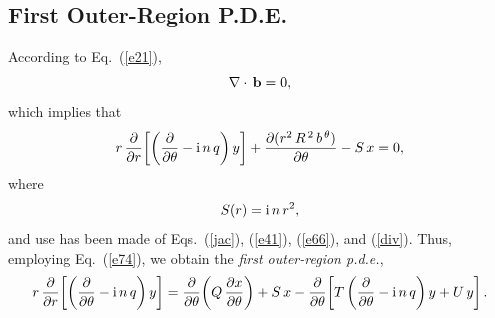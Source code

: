 \documentclass[12pt,prb,aps]{revtex4-1}
\begin{document}
\subsection{First Outer-Region P.D.E.}
According to Eq.~(\ref{e21}), 
\begin{equation}\label{divb}
\nabla \cdot\,{\bf b} =0,
\end{equation}
which implies that
\begin{equation}
r\,\frac{\partial}{\partial r}\!\left[\left(\frac{\partial}{\partial\theta}-{\rm i}\,n\,q\right)y\right]+\frac{\partial (r^2\,R^{\,2}\,b^{\,\theta})}{\partial \theta} - S\,x=0,
\end{equation}
where
\begin{equation}\label{s}
S(r) = {\rm i}\,n\,r^2,
\end{equation}
and use has been made of Eqs.~(\ref{jac}),  (\ref{e41}),  (\ref{e66}), and (\ref{div}).
Thus, employing Eq.~(\ref{e74}), we obtain the {\em first outer-region p.d.e.}, \cite{connor}
\begin{equation}\label{efirst}
r\,\frac{\partial}{\partial r}\!\left[\left(\frac{\partial}{\partial\theta}-{\rm i}\,n\,q\right)y\right]=\frac{\partial}{\partial\theta}\!\left(Q\,\frac{\partial x}{\partial\theta}\right)
+S\,x -\frac{\partial}{\partial\theta}\!\left[T\left(\frac{\partial}{\partial\theta}-{\rm i}\,n\,q\right)y+U\,y\right].
\end{equation}
\end{document}
